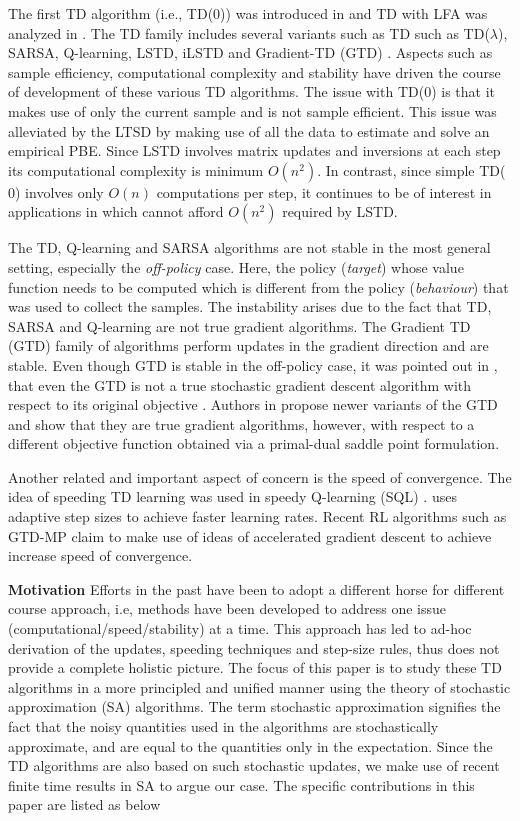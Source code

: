 The first TD algorithm (i.e., TD($0$)) was introduced in \cite{} and TD with LFA was analyzed in \cite{}. The TD family includes several variants such as TD such as TD($\lambda$), SARSA, Q-learning, LSTD, iLSTD and Gradient-TD (GTD) \cite{}. Aspects such as 
sample efficiency, computational complexity and stability have driven the course of development of these various TD algorithms. The issue with TD($0$) is that it makes use of only the current sample and is not sample efficient. This issue was alleviated by the LTSD by making use of all the data to estimate and solve an empirical PBE. Since LSTD involves matrix updates and inversions at each step its computational complexity is minimum $O(n^2)$. In contrast, since simple TD($0$) involves only $O(n)$ computations per step, it continues to be of interest in applications in which cannot afford $O(n^2)$ required by LSTD.\par
The TD, Q-learning and SARSA algorithms are not stable in the most general setting, especially the \emph{off-policy} case. Here, the policy (\emph{target}) whose value function needs to be  computed which is different from the policy (\emph{behaviour}) that was used to collect the samples. The instability arises due to the fact that TD, SARSA and Q-learning are not true gradient algorithms. The Gradient TD (GTD) family of algorithms perform updates in the gradient direction and are stable. Even though GTD is stable in the off-policy case, it was pointed out in \cite{}, that even the GTD is not a true stochastic gradient descent algorithm with respect to its original objective \cite{}. Authors in \cite{} propose newer variants of the GTD and show that they are true gradient algorithms, however, with respect to a different objective function obtained via a primal-dual saddle point formulation.\par
Another related and important aspect of concern is the speed of convergence. The idea of speeding TD learning was used in speedy Q-learning (SQL) \cite{sql}. \cite{} uses adaptive step sizes to achieve faster learning rates. Recent RL algorithms such as GTD-MP claim to make use of ideas of accelerated gradient descent to achieve increase speed of convergence.\par
\textbf{Motivation}  Efforts in the past have been to adopt a different horse for different course approach, i.e, methods have been developed to address one issue (computational/speed/stability) at a time. This approach has led to ad-hoc derivation of the updates, speeding techniques and step-size rules, thus does not provide a complete holistic picture. The focus of this paper is to study these TD algorithms in a more principled and unified manner using the theory of stochastic approximation (SA) algorithms. The term stochastic approximation signifies the fact that the noisy quantities used in the algorithms are stochastically approximate, and are equal to the quantities only in the expectation. Since the TD algorithms are also based on such stochastic updates, we make use of recent finite time results in SA \cite{} to argue our case. The specific contributions in this paper are listed as below
